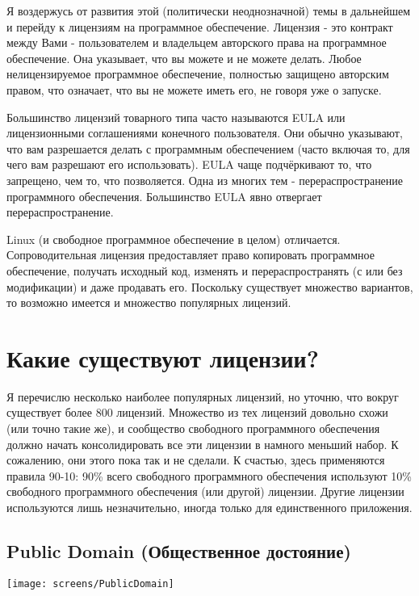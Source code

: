 \documentclass[12pt]{book}
\begin{document}
Я воздержусь от развития этой (политически неоднозначной) темы в дальнейшем и перейду к лицензиям на программное обеспечение. Лицензия - это контракт между Вами - пользователем и владельцем авторского права на программное обеспечение. Она указывает, что вы можете и не можете делать. Любое  нелицензируемое программное обеспечение, полностью защищено авторским правом, что означает, что вы не можете иметь его, не говоря уже о запуске.

Большинство лицензий товарного типа часто называются EULA или лицензионными соглашениями конечного пользователя. Они обычно указывают, что вам разрешается делать с программным обеспечением (часто включая то, для чего вам разрешают его использовать). EULA чаще подчёркивают то, что запрещено, чем то, что позволяется. Одна из многих тем - перераспространение программного обеспечения. Большинство EULA явно отвергает перераспространение.

Linux (и свободное программное обеспечение в целом) отличается. Сопроводительная лицензия предоставляет право копировать программное обеспечение, получать исходный код, изменять  и перераспространять (с или без модификации) и даже продавать его. Поскольку существует множество вариантов, то возможно имеется и множество популярных лицензий.

\section{Какие существуют лицензии?}

Я перечислю несколько наиболее популярных лицензий, но уточню, что вокруг существует более 800 лицензий. Множество из тех лицензий довольно схожи (или точно такие же), и сообщество свободного программного обеспечения должно начать консолидировать все  эти лицензии в намного меньший набор. К сожалению, они этого пока так и не сделали. К счастью, здесь применяются правила 90-10: 90\% всего свободного программного обеспечения используют 10\% свободного программного обеспечения (или другой) лицензии. Другие лицензии используются лишь незначительно, иногда только для единственного приложения.

\subsection{Public Domain (Общественное достояние)}

\begin{center}\texttt{[image: screens/PublicDomain]}\end{center}
\end{document}
